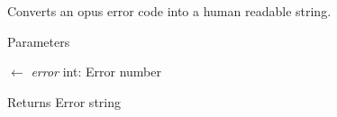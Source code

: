 Converts an opus error code into a human readable string. 
\begin{DoxyParams}{Parameters}
\item[\mbox{$\leftarrow$} {\em error}]{\ttfamily int}: Error number \end{DoxyParams}
\begin{DoxyReturn}{Returns}
Error string 
\end{DoxyReturn}
